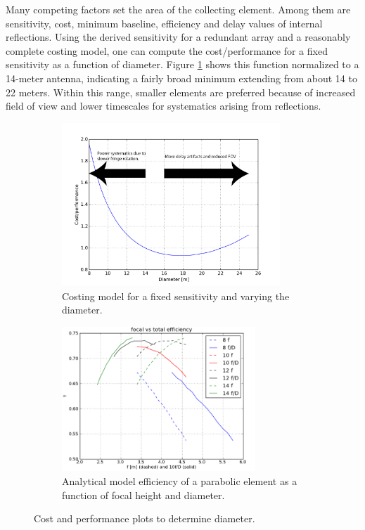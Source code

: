\documentclass[preprint]{aastex}
\begin{document}
Many competing factors set the area of the collecting element.  Among them are
sensitivity, cost, minimum baseline, efficiency and delay values of internal reflections.
Using the derived sensitivity for a redundant array \citep{parsons_et_al2012a} 
and a reasonably complete costing model, one can compute the cost/performance for a 
fixed sensitivity as a function of diameter.  
Figure \ref{fig:nvsd} shows 
this function normalized to a 14-meter antenna, indicating a fairly broad minimum 
extending from about 14 to 22 meters.  Within this range, smaller elements are
preferred because of increased field of view and lower timescales for systematics
arising from reflections. 

\begin{figure}[h]
	\centering
	\begin{subfigure}[b]{0.46\textwidth}
		\includegraphics[width=0.9\textwidth]{plots/nvsd.png}
		\caption{Costing model for a fixed sensitivity and varying the diameter.}
		\label{fig:nvsd} 
	\end{subfigure}
	\quad
	\begin{subfigure}[b]{0.46\textwidth}
		\includegraphics[width=0.8\textwidth]{plots/efficiency.png}
		\caption{Analytical model efficiency of a parabolic element as a function of focal height and diameter.}
		\label{fig:disheffic}
	\end{subfigure}
	\caption{Cost and performance plots to determine diameter.}
\end{figure}
\end{document}
